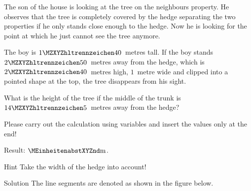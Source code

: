 \begin{MExercises}
\begin{MExercise}
The son of the house is looking at the tree on the neighbours property. He observes 
that the tree is completely covered by the hedge separating the two properties if
he only stands close enough to the hedge. Now he is looking for the point at which 
he just cannot see the tree anymore. 

The boy is $\MZahl{1}{40}$~metres tall. If the boy stands
$\MZahl{2}{50}$~metres away from the hedge, which is $\MZahl{2}{40}$~metres 
high, $1$~metre wide and clipped into a pointed shape at the top, the tree 
disappears from his sight.

What is the height of the tree if the middle of the trunk is $\MZahl{14}{5}$~metres away from 
the hedge?

Please carry out the calculation using variables and insert the values only at the end!

Result:  $\MEinheit{m}$.

\begin{MHint}{Hint}
Take the width of the hedge into account!
\end{MHint}

\begin{MHint}{Solution}
The line segments are denoted as shown in the figure below.


\end{MHint}
\end{MExercise}
\end{MExercises}
